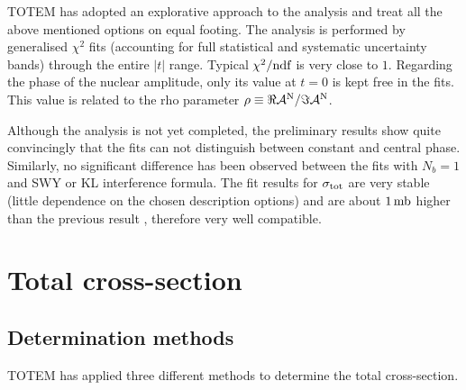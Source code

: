 \documentclass{desyproc}
\def\un#1{\,{\rm #1}}
\begin{document}
TOTEM has adopted an explorative approach to the analysis and treat all the above mentioned options on equal footing. The analysis is performed by generalised $\chi^2$ fits (accounting for full statistical and systematic uncertainty bands) through the entire $|t|$ range. Typical $\chi^2/\hbox{ndf}$ is very close to $1$. Regarding the phase of the nuclear amplitude, only its value at $t = 0$ is kept free in the fits. This value is related to the rho parameter $\rho \equiv \Re {\cal A}^{\rm N} / \Im {\cal A}^{\rm N}$.

Although the analysis is not yet completed, the preliminary results show quite convincingly that the fits can not distinguish between constant and central phase. Similarly, no significant difference has been observed between the fits with $N_b = 1$ and SWY or KL interference formula. The fit results for $\sigma_{\rm tot}$ are very stable (little dependence on the chosen description options) and are about $1\un{mb}$ higher than the previous result \cite{si_tot_8}, therefore very well compatible.



\section{Total cross-section}\label{s:tot}

\subsection{Determination methods}

TOTEM has applied three different methods to determine the total cross-section.
\end{document}
